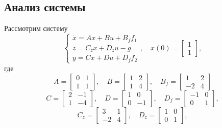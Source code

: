 \subsection{Анализ системы}
\label{sec:anal}
Рассмотрим систему
\begin{equation}
    \label{eq:sys2}
    \begin{cases}
        \dot x=Ax+Bu+B_ff_1\\
        z=C_zx+D_zu-g\\
        y=Cx+Du+D_ff_2
    \end{cases},\quad
    x(0)=\begin{bmatrix}
        1\\1
    \end{bmatrix},
\end{equation}
где
\begin{equation*}
    A=\begin{bmatrix}
        0&1\\1&1
    \end{bmatrix},\quad
    B=\begin{bmatrix}
        1&2\\1&4
    \end{bmatrix},\quad
    B_f=\begin{bmatrix}
        1&2\\-2&4
    \end{bmatrix}
\end{equation*}
\begin{equation*}
    C=\begin{bmatrix}
        2&-1\\1&-4
    \end{bmatrix},\quad
    D=\begin{bmatrix}
        1&0\\0&-1
    \end{bmatrix},\quad
    D_f=\begin{bmatrix}
        -1&0\\0&1
    \end{bmatrix},
\end{equation*}
\begin{equation*}
    C_z=\begin{bmatrix}
        3&1\\-2&4
    \end{bmatrix},\quad
    D_z=\begin{bmatrix}
        1&0\\0&1
    \end{bmatrix},
\end{equation*}
